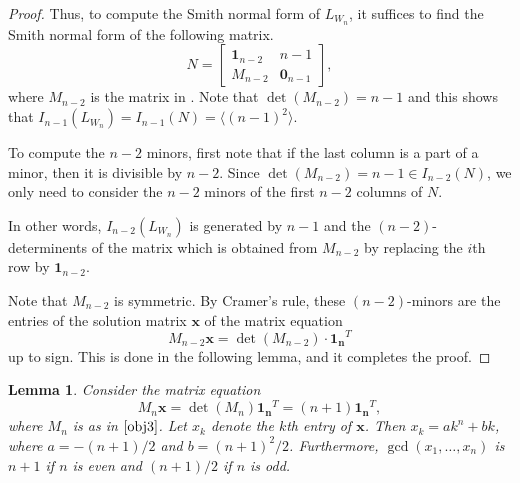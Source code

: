 \documentclass[11pt,reqno]{amsart}
\newcommand{\angles}[1]{\langle #1 \rangle}
\theoremstyle{definition}
\theoremstyle{plain}
\newtheorem{lemma}[mydef]{Lemma}
\begin{document}
\begin{proof}
\noindent Thus, to compute the Smith normal form of $L_{W_n}$, it suffices to find the Smith normal form of the following matrix.
\begin{equation*}
N = \left[
	\begin{array}{c|c}
	\mathbf{1}_{n-2} & n-1 \\
	\hline
	M_{n-2} & \mathbf{0}_{n-1}
	\end{array}
\right],
\end{equation*}
where $M_{n-2}$ is the matrix in . 
Note that $\det(M_{n-2}) = n-1$ and this shows that $I_{n-1}(L_{W_n}) = I_{n-1}(N) = \angles{(n-1)^2}$.

To compute the $n-2$ minors, first note that if the last column is a part of a minor, then it is divisible by $n-2$. 
Since $\det(M_{n-2}) = n-1 \in I_{n-2}(N)$, we only need to consider the $n-2$ minors of the first $n-2$ columns of $N$. 

In other words, $I_{n-2}(L_{W_n})$ is generated by $n-1$ 
and the $(n-2)$-determinents of the matrix which is obtained from $M_{n-2}$ by replacing the $i$th row by $\mathbf{1}_{n-2}$.

Note that $M_{n-2}$ is symmetric. 
By Cramer's rule, these $(n-2)$-minors are the entries of the solution matrix $\mathbf{x}$ of the matrix equation
\begin{equation*}
M_{n-2} \mathbf{x} 
= \det(M_{n-2}) \cdot \mathbf{1_n}^T
\end{equation*}
up to sign.
This is done in the following lemma, and it completes the proof.
\end{proof}

\begin{lemma}\label{M_nCremer}
Consider the matrix equation 
\begin{equation*}
M_n \mathbf{x} 
= \det(M_n) \mathbf{1_n}^T
= (n+1) \mathbf{1_n}^T,
\end{equation*}
where $M_n$ is as in $\Cref{obj3}$. 
Let $x_k$ denote the $k$th entry of $\mathbf{x}$. Then $x_k = a k^n + b k$, where $a = -(n+1)/2$ and $b = (n+1)^2/2$. 
Furthermore, $\gcd(x_1,\dots, x_n)$ is $n+1$ if $n$ is even and $(n+1)/2$ if $n$ is odd. 
\end{lemma}
\end{document}
